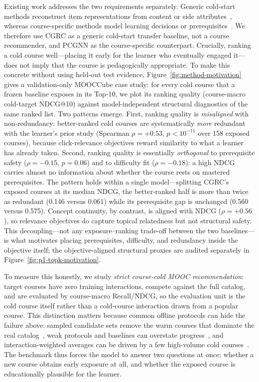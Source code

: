 \documentclass[letterpaper]{article}
\begin{document}
Existing work addresses the two requirements separately. Generic cold-start methods reconstruct item representations from content or side attributes~\cite{schein2002coldstart,gantner2010attribute,volkovs2017dropoutnet,kim2024cgrc}, whereas course-specific methods model learning decisions or prerequisites~\cite{zhang2019hrlcourse,sun2024pcgnn}. We therefore use CGRC as a generic cold-start transfer baseline, not a course recommender, and PCGNN as the course-specific counterpart. Crucially, ranking a cold course well---placing it early for the learner who eventually engaged it---does not imply that the course is pedagogically appropriate. To make this concrete without using held-out test evidence, Figure~\ref{fig:method-motivation} gives a validation-only MOOCCube case study: for every cold course that a frozen baseline exposes in its Top-10, we plot its ranking quality (course-macro cold-target NDCG@10) against model-independent structural diagnostics of the same ranked list. Two patterns emerge. First, ranking quality is \emph{misaligned} with non-redundancy: better-ranked cold courses are systematically \emph{more} redundant with the learner's prior study (Spearman $\rho=+0.53$, $p<10^{-11}$ over 158 exposed courses), because click-relevance objectives reward similarity to what a learner has already taken. Second, ranking quality is essentially \emph{orthogonal} to prerequisite safety ($\rho=-0.15$, $p=0.06$) and to difficulty fit ($\rho=-0.18$): a high NDCG carries almost no information about whether the course rests on mastered prerequisites. The pattern holds within a single model---splitting CGRC's exposed courses at its median NDCG, the better-ranked half is more than twice as redundant (0.146 versus 0.061) while its prerequisite gap is unchanged (0.560 versus 0.575). Concept continuity, by contrast, is aligned with NDCG ($\rho=+0.56$), so relevance objectives do capture topical relatedness but not structural safety. This decoupling---not any exposure--ranking trade-off between the two baselines---is what motivates placing prerequisites, difficulty, and redundancy inside the objective itself; the objective-aligned structural proxies are audited separately in Figure~\ref{fig:p1-topk-motivation}.

To measure this honestly, we study \emph{strict course-cold MOOC recommendation}: target courses have zero training interactions, compete against the full catalog, and are evaluated by course-macro Recall/NDCG, so the evaluation unit is the cold course itself rather than a cold-course interaction drawn from a popular course. This distinction matters because common offline protocols can hide the failure above: sampled candidate sets remove the warm courses that dominate the real catalog~\cite{krichene2020sampled}, weak protocols and baselines can overstate progress~\cite{dacrema2019progress}, and interaction-weighted averages can be driven by a few high-volume cold courses~\cite{takehi2025diversification}. The benchmark thus forces the model to answer two questions at once: whether a new course obtains early exposure at all, and whether the exposed course is educationally plausible for the learner.
\end{document}

